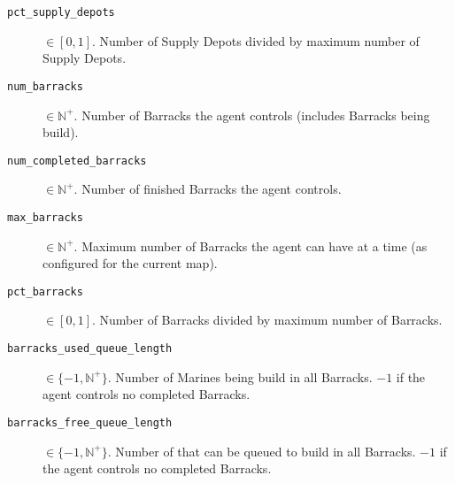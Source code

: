 \begin{description}
    \item[\texttt{pct\_supply\_depots}] $\in [0,1]$. Number of Supply Depots divided by maximum number of Supply Depots.
    \item[\texttt{num\_barracks}] $\in \mathbb{N}^+$. Number of Barracks the agent controls (includes Barracks being build).
    \item[\texttt{num\_completed\_barracks}] $\in \mathbb{N}^+$. Number of finished Barracks the agent controls.
    \item[\texttt{max\_barracks}] $\in \mathbb{N}^+$. Maximum number of Barracks the agent can have at a time (as configured for the current map).
    \item[\texttt{pct\_barracks}] $\in [0,1]$. Number of Barracks divided by maximum number of Barracks.
    \item[\texttt{barracks\_used\_queue\_length}] $\in \{-1, \mathbb{N}^+\}$. Number of Marines being build in all Barracks. $-1$ if the agent controls no completed Barracks.
    \item[\texttt{barracks\_free\_queue\_length}] $\in \{-1, \mathbb{N}^+\}$. Number of that can be queued to build in all Barracks. $-1$ if the agent controls no completed Barracks.
\end{description}

